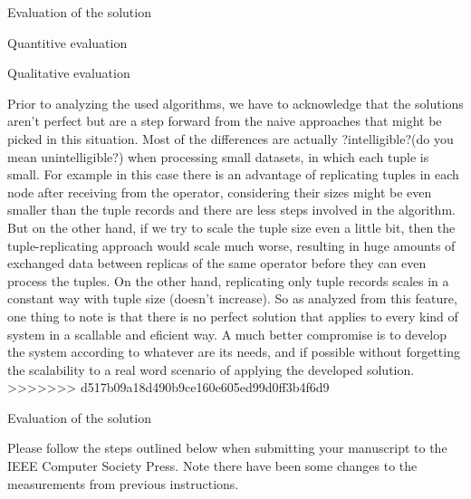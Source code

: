 \documentclass[times, 10pt,twocolumn]{article}
\begin{document}

Evaluation of the solution


Quantitive evaluation


Qualitative evaluation


Prior to analyzing the used algorithms, we have to acknowledge that the
solutions aren't perfect but are a step forward from the naive approaches
that might be picked in this situation. Most of the differences are
actually ?intelligible?(do you mean unintelligible?) when processing small datasets, in which each
tuple is small.  For example in this case there is an advantage of
replicating tuples in each node after receiving from the operator,
considering their sizes might be even smaller than the tuple records and
there are less steps involved in the algorithm. But on the other hand, if
we try to scale the tuple size even a little bit, then the
tuple-replicating approach would scale much worse, resulting in huge
amounts of exchanged data between replicas of the same operator before
they can even process the tuples. On the other hand, replicating only
tuple records scales in a constant way with tuple size (doesn't increase).
So as analyzed from this feature, one thing to note is that there is no
perfect solution that applies to every kind of system in a scallable and
eficient way.  A much better compromise is to develop the system according
to whatever are its needs, and if possible without forgetting the
scalability to a real word scenario of applying the developed solution.
>>>>>>> d517b09a18d490b9ce160e605ed99d0ff3b4f6d9


Evaluation of the solution


Please follow the steps outlined below when submitting your manuscript to
the IEEE Computer Society Press. Note there have been some changes to the
measurements from previous instructions. 
\end{document}
